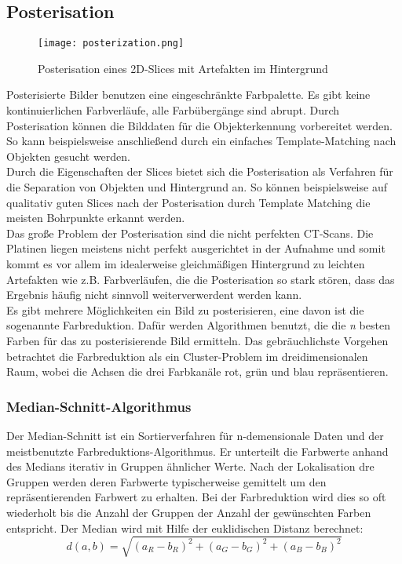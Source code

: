\subsection {Posterisation}
\begin{figure}[H]
  \begin{center}
    \texttt{[image: posterization.png]}
    \caption{Posterisation eines 2D-Slices mit Artefakten im Hintergrund}
    \label{fig:posterization1}
  \end{center}
\end{figure}

Posterisierte Bilder benutzen eine eingeschränkte Farbpalette. Es gibt keine kontinuierlichen Farbverläufe, alle Farbübergänge sind abrupt. Durch Posterisation können die Bilddaten für die Objekterkennung vorbereitet werden. So kann beispielsweise anschließend durch ein einfaches Template-Matching nach Objekten gesucht werden. \\
Durch die Eigenschaften der Slices bietet sich die Posterisation als Verfahren für die Separation von Objekten und Hintergrund an. So können beispielsweise auf qualitativ guten Slices nach der Posterisation durch Template Matching die meisten Bohrpunkte erkannt werden. \\
Das große Problem der Posterisation sind die nicht perfekten CT-Scans. Die Platinen liegen meistens nicht perfekt ausgerichtet in der Aufnahme und somit kommt es vor allem im idealerweise gleichmäßigen Hintergrund zu leichten Artefakten wie z.B. Farbverläufen, die die Posterisation so stark stören, dass das Ergebnis häufig nicht sinnvoll weiterverwerdent werden kann. \\
Es gibt mehrere Möglichkeiten ein Bild zu posterisieren, eine davon ist die sogenannte Farbreduktion. Dafür werden Algorithmen benutzt, die die \textit{n} besten Farben für das zu posterisierende Bild ermitteln. Das gebräuchlichste Vorgehen betrachtet die Farbreduktion als ein Cluster-Problem im dreidimensionalen Raum, wobei die Achsen die drei Farbkanäle rot, grün und blau repräsentieren.
\subsubsection {Median-Schnitt-Algorithmus}
Der Median-Schnitt ist ein Sortierverfahren für n-demensionale Daten und der meistbenutzte Farbreduktions-Algorithmus. Er unterteilt die Farbwerte anhand des Medians iterativ in Gruppen ähnlicher Werte. Nach der Lokalisation dre Gruppen werden deren Farbwerte typischerweise gemittelt um den repräsentierenden Farbwert zu erhalten. Bei der Farbreduktion wird dies so oft wiederholt bis die Anzahl der Gruppen der Anzahl der gewünschten Farben entspricht. Der Median  wird mit Hilfe der euklidischen Distanz berechnet:
\begin{equation*}
d(a,b)=\sqrt{(a_R-b_R)^2 + (a_G-b_G)^2 + (a_B-b_B)^2}
\end{equation*}
